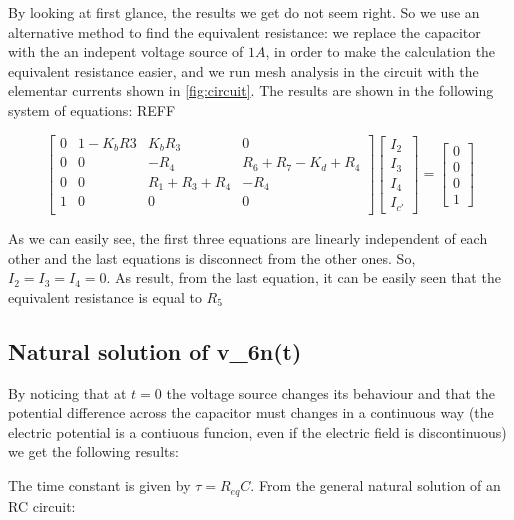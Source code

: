 By looking at first glance, the results we get do not seem right. So we use an alternative method to find the equivalent resistance: we replace the capacitor with the an indepent voltage source of $1 A$, in order to make the calculation the equivalent resistance easier,
and we run mesh analysis in the circuit with the elementar currents shown in \ref{fig:circuit}. The results are shown in the following system of equations: REFF

\[
  \begin{bmatrix}
    0 & 1-K_b R3 & K_b R_3         & 0                     \\
    0 & 0        & -R_4            & R_6 + R_7 - K_d + R_4 \\
    0 & 0        & R_1 + R_3 + R_4 & -R_4                  \\
    1 & 0        & 0               & 0                     \\
  \end{bmatrix}
  \begin{bmatrix}
    I_2 \\ I_3 \\ I_4 \\ I_{c'}
  \end{bmatrix}
  =
  \begin{bmatrix}
    0 \\ 0 \\ 0 \\ 1
  \end{bmatrix}
\]

\hfill


As we can easily see, the first three equations are linearly independent of each other and the last equations is disconnect from the other ones. So, $I_2 = I_3 = I_4 = 0$. As result, from the last equation, it can be easily seen that
the equivalent resistance is equal to $R_5$




\subsection{Natural solution of v_{6n}(t)}

By noticing that at $t = 0$ the voltage source changes its behaviour and that the potential difference across the capacitor must changes in a continuous way (the electric potential is a contiuous funcion, even  if the electric field is discontinuous)
we get the following results:

The time constant is given by $\tau = R_{eq}C$.
From the general natural solution of an RC circuit:

